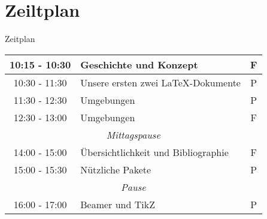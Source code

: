 \documentclass[11pt]{beamer}
\begin{document}
\section{Zeiltplan}
\begin{frame}[fragile]{Zeitplan}
\begin{tabular}{c|l|c}
\toprule
10:15 - 10:30 & Geschichte und Konzept & F\\
\midrule
10:30 - 11:30 & Unsere ersten zwei \LaTeX -Dokumente & P\\
\midrule
11:30 - 12:30 & Umgebungen & P\\
\midrule
12:30 - 13:00 & Umgebungen & F\\
\midrule
\multicolumn{3}{c}{\textit{Mittagspause}}\\
\midrule
14:00 - 15:00 & Übersichtlichkeit und Bibliographie & F\\
\midrule
15:00 - 15:30 & Nützliche Pakete & P\\
\midrule
\multicolumn{3}{c}{\textit{Pause}}\\
\midrule
16:00 - 17:00 & Beamer und TikZ & P\\
\bottomrule
\end{tabular}
\end{frame}
\end{document}
